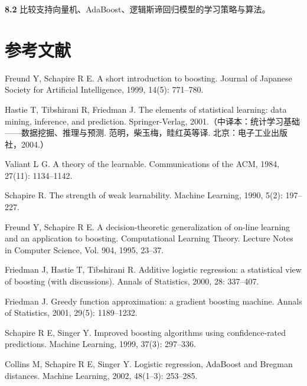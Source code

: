 \documentclass[UTF8, 12pt, fontset=fandol, oneside]{ctexart}
\begin{document}
\noindent\textbf{8.2}\quad
比较支持向量机、AdaBoost、逻辑斯谛回归模型的学习策略与算法。

\section*{参考文献}

\begin{enumerate}[label={[\arabic*]},leftmargin=2.8em]
\item Freund Y, Schapire R E. A short introduction to boosting. Journal of Japanese Society for Artificial Intelligence, 1999, 14(5): 771--780.
\item Hastie T, Tibshirani R, Friedman J. The elements of statistical learning: data mining, inference, and prediction. Springer-Verlag, 2001.（中译本：统计学习基础——数据挖掘、推理与预测. 范明，柴玉梅，眭红英等译. 北京：电子工业出版社，2004.）
\item Valiant L G. A theory of the learnable. Communications of the ACM, 1984, 27(11): 1134--1142.
\item Schapire R. The strength of weak learnability. Machine Learning, 1990, 5(2): 197--227.
\item Freund Y, Schapire R E. A decision-theoretic generalization of on-line learning and an application to boosting. Computational Learning Theory. Lecture Notes in Computer Science, Vol. 904, 1995, 23--37.
\item Friedman J, Hastie T, Tibshirani R. Additive logistic regression: a statistical view of boosting (with discussions). Annals of Statistics, 2000, 28: 337--407.
\item Friedman J. Greedy function approximation: a gradient boosting machine. Annals of Statistics, 2001, 29(5): 1189--1232.
\item Schapire R E, Singer Y. Improved boosting algorithms using confidence-rated predictions. Machine Learning, 1999, 37(3): 297--336.
\item Collins M, Schapire R E, Singer Y. Logistic regression, AdaBoost and Bregman distances. Machine Learning, 2002, 48(1--3): 253--285.
\end{enumerate}
\end{document}
